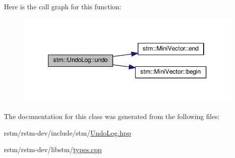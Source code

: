 Here is the call graph for this function\-:
\nopagebreak
\begin{figure}[H]
\begin{center}
\leavevmode
\includegraphics[width=338pt]{classstm_1_1UndoLog_aea232bbba4e66c65d726d66ff437f2f7_cgraph}
\end{center}
\end{figure}




The documentation for this class was generated from the following files\-:\begin{DoxyCompactItemize}
\item 
rstm/rstm-\/dev/include/stm/\hyperlink{UndoLog_8hpp}{Undo\-Log.\-hpp}\item 
rstm/rstm-\/dev/libstm/\hyperlink{types_8cpp}{types.\-cpp}\end{DoxyCompactItemize}
